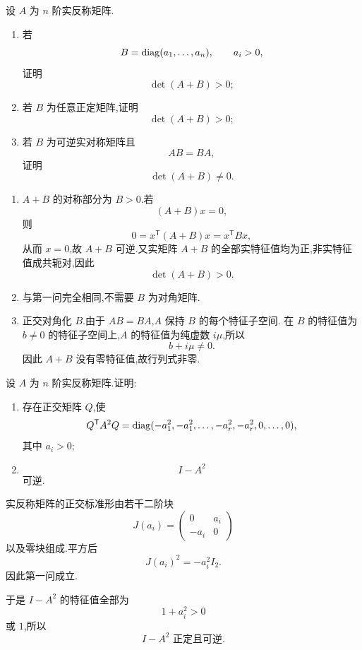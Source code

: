 \begin{example}
设 $A$ 为 $n$ 阶实反称矩阵.
\begin{enumerate}
    \item 若
    \[
    B=\operatorname{diag}(a_1,\ldots,a_n),
    \qquad a_i>0,
    \]
    证明
    \[
    \det(A+B)>0;
    \]
    \item 若 $B$ 为任意正定矩阵,证明
    \[
    \det(A+B)>0;
    \]
    \item 若 $B$ 为可逆实对称矩阵且
    \[
    AB=BA,
    \]
    证明
    \[
    \det(A+B)\neq0.
    \]
\end{enumerate}
\end{example}
\exampleblank

\begin{solution}
\leavevmode
\begin{enumerate}
    \item $A+B$ 的对称部分为 $B>0$.若
    \[
    (A+B)x=0,
    \]
    则
    \[
    0=x^{\mathsf T}(A+B)x=x^{\mathsf T}Bx,
    \]
    从而 $x=0$,故 $A+B$ 可逆.又实矩阵 $A+B$ 的全部实特征值均为正,非实特征值成共轭对,因此
    \[
    \det(A+B)>0.
    \]

    \item 与第一问完全相同,不需要 $B$ 为对角矩阵.

    \item 正交对角化 $B$.由于 $AB=BA$,$A$ 保持 $B$ 的每个特征子空间.
    在 $B$ 的特征值为 $b\neq0$ 的特征子空间上,$A$ 的特征值为纯虚数 $i\mu$,所以
    \[
    b+i\mu\neq0.
    \]
    因此 $A+B$ 没有零特征值,故行列式非零.
\end{enumerate}
\end{solution}


\begin{example}
设 $A$ 为 $n$ 阶实反称矩阵.证明:
\begin{enumerate}
    \item 存在正交矩阵 $Q$,使
    \[
    Q^{\mathsf T}A^2Q
    =
    \operatorname{diag}(
    -a_1^2,-a_1^2,
    \ldots,
    -a_r^2,-a_r^2,
    0,\ldots,0),
    \]
    其中 $a_i>0$;
    \item
    \[
    I-A^2
    \]
    可逆.
\end{enumerate}
\end{example}
\exampleblank

\begin{solution}
实反称矩阵的正交标准形由若干二阶块
\[
J(a_i)=
\begin{pmatrix}
0&a_i\\
-a_i&0
\end{pmatrix}
\]
以及零块组成.平方后
\[
J(a_i)^2=-a_i^2I_2.
\]
因此第一问成立.

于是 $I-A^2$ 的特征值全部为
\[
1+a_i^2>0
\]
或 $1$,所以
\[
\boxed{I-A^2\text{ 正定且可逆}.}
\]
\end{solution}


